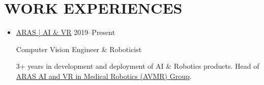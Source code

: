 \documentclass[11pt,a4paper,sans]{moderncv} %
\begin{document}
	\section{WORK EXPERIENCES}
	\begin{itemize}
		\item \href{https://aras.kntu.ac.ir/ai}{ ARAS | AI \& VR} \hfill 2019--Present
		
		Computer Vision Engineer \& Roboticist 
		
		3+ years in development and deployment of AI \& Robotics products. Head of \href{https://aras.kntu.ac.ir/ai}{ARAS AI and VR in Medical Robotics (AVMR) Group}.
			
			

\end{itemize}
\end{document}
